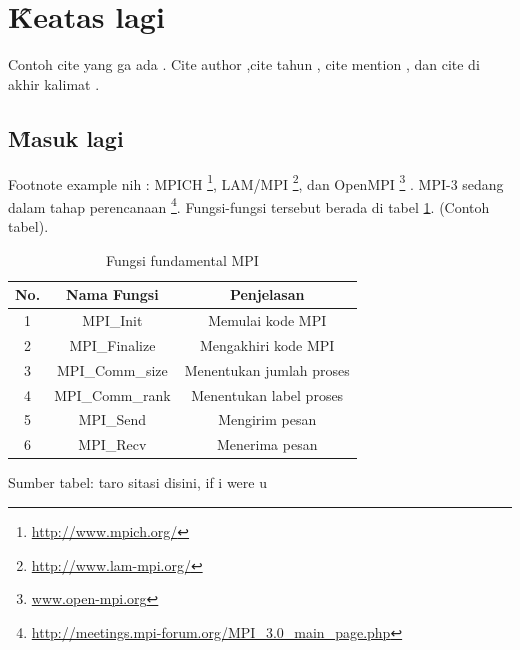 \section{\f{Keatas lagi}}
Contoh cite yang ga ada \cite{gaib}. Cite author \citeauthor{article.rebecca},cite tahun \citeyear{article.treese}, cite mention \cite{adin.experiment}, dan cite di akhir kalimat \citep{techreport.nist}.
\subsection{\f{Masuk lagi}}
Footnote example nih : MPICH \footnote{\url{http://www.mpich.org/}}, LAM/MPI \footnote{\url{http://www.lam-mpi.org/}}, dan OpenMPI \footnote{\url{www.open-mpi.org}} \citep{article.mcguire}. MPI-3 sedang dalam tahap perencanaan \footnote{\url{http://meetings.mpi-forum.org/MPI_3.0_main_page.php}}. Fungsi-fungsi tersebut berada di tabel \ref{tab:mpifund}. (Contoh tabel).

\begin{table}
	\centering
	\caption{Fungsi fundamental MPI}
	\label{tab:mpifund}
	\begin{tabular}{|c|c|c|}
	\hline
	\rowcolor{headertbl}	
	\hline No. & Nama Fungsi & Penjelasan \\ 
	\hline 1 & MPI\_Init & Memulai kode MPI \\ 
	\hline 2 & MPI\_Finalize & Mengakhiri kode MPI \\ 
	\hline 3 & MPI\_Comm\_size & Menentukan jumlah proses \\ 
	\hline 4 & MPI\_Comm\_rank & Menentukan label proses \\ 
	\hline 5 & MPI\_Send & Mengirim pesan \\ 
	\hline 6 & MPI\_Recv & Menerima pesan \\ 
	\hline
	\end{tabular}
\end{table}
\begin{center}
{\small Sumber tabel: taro sitasi disini, if i were u}
\end{center}